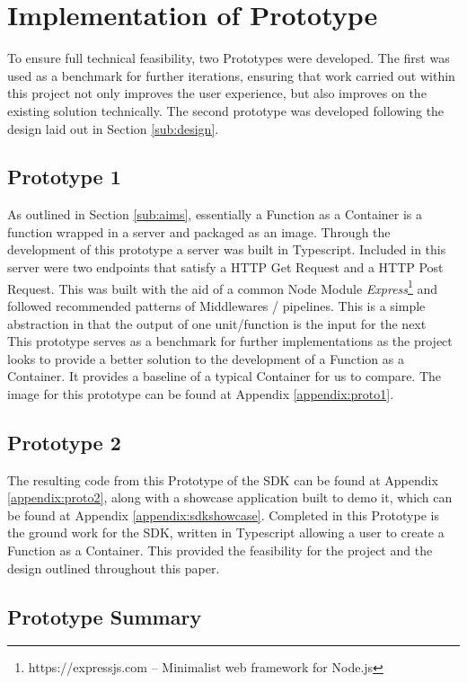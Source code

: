 \section{Implementation of Prototype}
\label{sub:poc}
To ensure full technical feasibility, two Prototypes were developed. The first was used as a benchmark for further iterations, ensuring that work carried out within this project not only improves the user experience, but also improves on the existing solution technically. The second prototype was developed following the design laid out in Section \ref{sub:design}.

\subsection{Prototype 1}
\label{sub:proto1}
As outlined in Section \ref{sub:aims}, essentially a Function as a Container is a function wrapped in a server and packaged as an image. Through the development of this prototype a server was built in Typescript. Included in this server were two endpoints that satisfy a HTTP Get Request and a HTTP Post Request. This was built with the aid of a common Node Module \textit{Express}\footnote{https://expressjs.com -- Minimalist web framework for Node.js} and followed recommended patterns of Middlewares / pipelines. This is a simple abstraction in that the output of one unit/function is the input for the next
\\This prototype serves as a benchmark for further implementations as the project looks to provide a better solution to the development of a Function as a Container. It provides a baseline of a typical Container for us to compare. The image for this prototype can be found at Appendix \ref{appendix:proto1}.

\subsection{Prototype 2}
\label{sub:proto2}
The resulting code from this Prototype of the SDK can be found at Appendix \ref{appendix:proto2}, along with a showcase application built to demo it, which can be found at Appendix \ref{appendix:sdkshowcase}. Completed in this Prototype is the ground work for the SDK, written in Typescript allowing a user to create a Function as a Container. This provided the feasibility for the project and the design outlined throughout this paper.

\subsection{Prototype Summary}
\label{sub:protosum}

